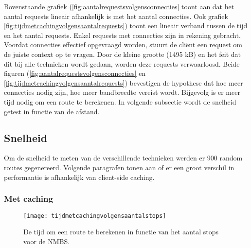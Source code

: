 \begin{figure}[!tbp]
  \centering
  \hfill
\end{figure}
Bovenstaande grafiek (\ref{fig:aantalrequestsvolgensconnecties} toont aan dat het aantal requests lineair afhankelijk is met het aantal connecties. Ook grafiek \ref{fig:tijdmetcachingvolgensaantalrequests}) toont een lineair verband tussen de tijd en het aantal requests. Enkel requests met connecties zijn in rekening gebracht. Voordat connecties effectief opgevraagd worden, stuurt de cli\"ent een request om de juiste context op te vragen. Door de kleine grootte (1495 kB) en het feit dat dit bij alle technieken wordt gedaan, worden deze requests verwaarloosd. Beide figuren (\ref{fig:aantalrequestsvolgensconnecties} en \ref{fig:tijdmetcachingvolgensaantalrequests}) bevestigen de hypothese dat hoe meer connecties nodig zijn, hoe meer bandbreedte vereist wordt. Bijgevolg is er meer tijd nodig om een route te berekenen. In volgende subsectie wordt de snelheid getest in functie van de afstand.

\subsection{Snelheid}
Om de snelheid te meten van de verschillende technieken werden er 900 random routes gegenereerd. Volgende paragrafen tonen aan of er een groot verschil in performantie is afhankelijk van client-side caching.

\subsubsection{Met caching}
 
\begin{figure}[h!]
\centering
\texttt{[image: tijdmetcachingvolgensaantalstops]}
\caption{De tijd om een route te berekenen in functie van het aantal stops voor de NMBS.}
\label{tijdmetcachingvolgensaantalstops}
\end{figure}

